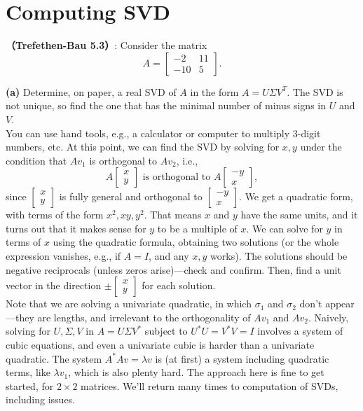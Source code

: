 \documentclass[lang=cn,11pt]{elegantbook}
\begin{document}
\section{Computing SVD}
\textbf{（Trefethen-Bau 5.3）}: Consider the matrix
\[
A = \begin{bmatrix}
-2 & 11 \\
-10 & 5
\end{bmatrix}.
\]

   \textbf{ (a) }Determine, on paper, a real SVD of $A$ in the form $A = U \Sigma V^T$. The SVD is not unique, so find the one that has the minimal number of minus signs in $U$ and $V$.\\
   You can use hand tools, e.g., a calculator or computer to multiply 3-digit numbers, etc. At this point, we can find the SVD by solving for $x, y$ under the condition that $A v_1$ is orthogonal to $A v_2$, i.e.,
    \[
    A \begin{bmatrix} x \\ y \end{bmatrix} \text{ is orthogonal to } A \begin{bmatrix} -y \\ x \end{bmatrix},
    \]
    since $\begin{bmatrix} x \\ y \end{bmatrix}$ is fully general and orthogonal to $\begin{bmatrix} -y \\ x \end{bmatrix}$. We get a quadratic form, with terms of the form $x^2, xy, y^2$. That means $x$ and $y$ have the same units, and it turns out that it makes sense for $y$ to be a multiple of $x$. We can solve for $y$ in terms of $x$ using the quadratic formula, obtaining two solutions (or the whole expression vanishes, e.g., if $A = I$, and any $x, y$ works). The solutions should be negative reciprocals (unless zeros arise)—check and confirm. Then, find a unit vector in the direction $\pm \begin{bmatrix} x \\ y \end{bmatrix}$ for each solution.\\
    Note that we are solving a univariate quadratic, in which $\sigma_1$ and $\sigma_2$ don’t appear—they are lengths, and irrelevant to the orthogonality of $Av_1$ and $Av_2$. Naively, solving for $U, \Sigma, V$ in $A = U \Sigma V^*$ subject to $U^*U = V^*V = I$ involves a system of cubic equations, and even a univariate cubic is harder than a univariate quadratic. The system $A^*Av = \lambda v$ is (at first) a system including quadratic terms, like $\lambda v_1$, which is also plenty hard. The approach here is fine to get started, for $2 \times 2$ matrices. We’ll return many times to computation of SVDs, including issues.
\end{document}
